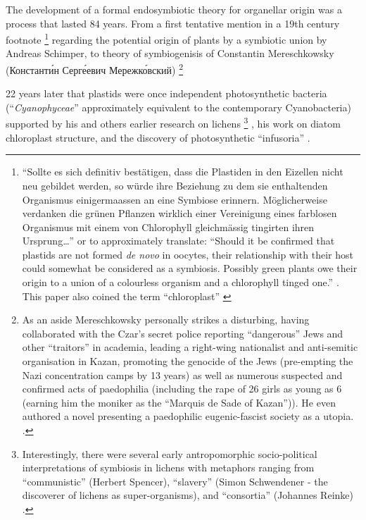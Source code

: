 The development of a formal endosymbiotic theory for organellar origin was a process that
lasted 84 years. From a first tentative mention in a 19th century footnote 
\footnote{``Sollte es sich definitiv best\"atigen, dass die Plastiden in den 
    Eizellen nicht neu gebildet werden, so w\"urde ihre Beziehung zu dem sie 
    enthaltenden Organismus einigermaassen an eine Symbiose erinnern. M\"oglicherweise
    verdanken die gr\"unen Pflanzen wirklich einer Vereinigung eines farblosen Organismus
    mit einem von Chlorophyll gleichm\"assig tingirten ihren Ursprung\ldots''
    \citep{Schimper1883} or to approximately translate: ``Should it be confirmed
    that plastids are not formed \textit{de novo} in oocytes, their relationship with
    their host could somewhat be considered as a symbiosis.  Possibly green plants owe
    their origin to a union of a colourless organism and a chlorophyll tinged one.''
    \citep{Neuhauser2014}.
    This paper also coined the term ``chloroplast'' \citep{Sapp2002}} 
regarding the potential origin of plants by a symbiotic union by Andreas Schimper, 
to theory of symbiogenisis of Constantin Mereschkowsky (Константи́н Серге́евич Мережко́вский)
\footnote{As an aside Mereschkowsky personally strikes a disturbing, having
    collaborated with the Czar's secret police reporting ``dangerous''
    Jews and other ``traitors'' in academia, leading a right-wing nationalist
    and anti-semitic organisation in Kazan, promoting the genocide of the Jews
    (pre-empting the Nazi concentration camps by 13 years) as well as numerous suspected and 
    confirmed acts of paedophilia (including the rape of 26 girls as young as 6 
    (earning him the moniker as the ``Marquis de Sade of Kazan'')).  
    He even authored a novel presenting a paedophilic eugenic-fascist
    society as a utopia.  
    \citep{Sapp2002}.}

22 years later that plastids were once independent photosynthetic bacteria 
(``\textit{Cyanophyceae}'' approximately equivalent to the contemporary Cyanobacteria) 
supported by his and others earlier research on lichens \footnote{
Interestingly, there were several early antropomorphic socio-political 
interpretations of symbiosis in lichens with metaphors ranging from ``communistic'' 
(Herbert Spencer), ``slavery'' (Simon Schwendener - the discoverer of lichens as
super-organisms), and ``consortia'' (Johannes Reinke) \citep{Sapp2002}.}
, his work on diatom chloroplast structure, and the discovery of 
photosynthetic ``infusoria'' \citep{Mereschkowsky1905,Martin1999a,Sapp2002}. 

